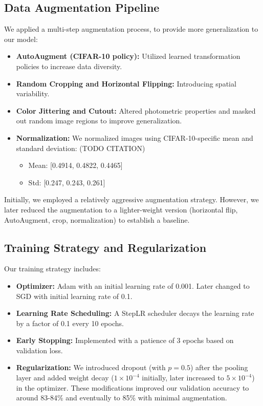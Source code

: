\documentclass[letterpaper]{article} %
\begin{document}
\subsection{Data Augmentation Pipeline}
We applied a multi-step augmentation process, to provide more generalization to our model:
\begin{itemize}
    \item \textbf{AutoAugment (CIFAR-10 policy):} Utilized learned transformation policies to increase data diversity.
    \item \textbf{Random Cropping and Horizontal Flipping:} Introducing spatial variability.
    \item \textbf{Color Jittering and Cutout:} Altered photometric properties and masked out random image regions to improve generalization.
    \item \textbf{Normalization:} We normalized images using CIFAR-10-specific mean and standard deviation: (TODO CITATION)
    \begin{itemize}
        \item Mean: [0.4914, 0.4822, 0.4465]
        \item Std: [0.247, 0.243, 0.261]
    \end{itemize}
\end{itemize}

Initially, we employed a relatively aggressive augmentation strategy. However, we later reduced the augmentation to a lighter-weight version (horizontal flip, AutoAugment, crop, normalization) to establish a baseline.

\subsection{Training Strategy and Regularization}
Our training strategy includes:
\begin{itemize}
    \item \textbf{Optimizer:} Adam with an initial learning rate of 0.001. Later changed to SGD with initial learning rate of 0.1.
    \item \textbf{Learning Rate Scheduling:} A StepLR scheduler decays the learning rate by a factor of 0.1 every 10 epochs.
    \item \textbf{Early Stopping:} Implemented with a patience of 3 epochs based on validation loss.
    \item \textbf{Regularization:} We introduced dropout (with $p=0.5$) after the pooling layer and added weight decay ($1\times10^{-4}$ initially, later increased to $5\times10^{-4}$) in the optimizer. These modifications improved our validation accuracy to around 83-84\% and eventually to 85\% with minimal augmentation.
\end{itemize}
\end{document}
